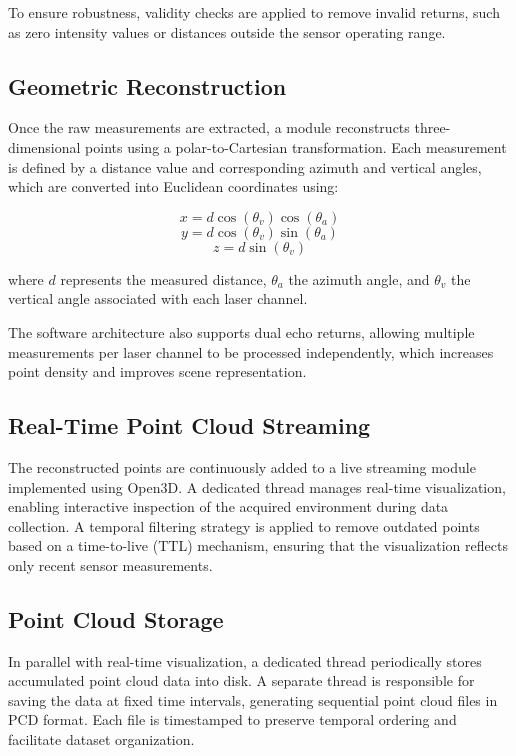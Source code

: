 To ensure robustness, validity checks are applied to remove invalid returns, such as zero intensity values or distances outside the sensor operating range.

\subsection{Geometric Reconstruction}
\label{subsec:geometric_reconstruction}

Once the raw measurements are extracted, a module reconstructs three-dimensional points using a polar-to-Cartesian transformation. Each measurement is defined by a distance value and corresponding azimuth and vertical angles, which are converted into Euclidean coordinates using:

\[
x = d \cos(\theta_v) \cos(\theta_a)
\]
\[
y = d \cos(\theta_v) \sin(\theta_a)
\]
\[
z = d \sin(\theta_v)
\]

where \(d\) represents the measured distance, \(\theta_a\) the azimuth angle, and \(\theta_v\) the vertical angle associated with each laser channel.

The software architecture also supports dual echo returns, allowing multiple measurements per laser channel to be processed independently, which increases point density and improves scene representation.

\subsection{Real-Time Point Cloud Streaming}
\label{subsec:streaming}

The reconstructed points are continuously added to a live streaming module implemented using Open3D.\cite{Zhou2018Open3D} A dedicated thread manages real-time visualization, enabling interactive inspection of the acquired environment during data collection. A temporal filtering strategy is applied to remove outdated points based on a time-to-live (TTL) mechanism, ensuring that the visualization reflects only recent sensor measurements.

\subsection{Point Cloud Storage}
\label{subsec:storage}

In parallel with real-time visualization, a dedicated thread periodically stores accumulated point cloud data into disk. A separate thread is responsible for saving the data at fixed time intervals, generating sequential point cloud files in PCD format.\cite{PCDFormat} Each file is timestamped to preserve temporal ordering and facilitate dataset organization.

